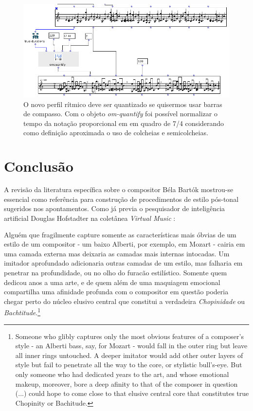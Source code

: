 \documentclass[
	12pt,				%
	openright,			%
	twoside,			%
	a4paper,			%
	english,			%
	french,				%
	spanish,			%
	brazil				%
	]{abntex2}
\begin{document}
\pagebreak
\begin{figure}[!h]
	\caption{\label{fig_grafico}O novo perfil rítmico deve ser quantizado se quisermos usar barras de compasso. Com o objeto \textit{om-quantify} foi possível normalizar o tempo da notação proporcional em em quadro de 7/4 considerando como definição aproximada o uso de colcheias e semicolcheias.  }
	\begin{center}
	    \includegraphics[scale=0.65]{OMPD/OMquantify.png}
	\end{center}
\end{figure}



\chapter*[Conclusão]{Conclusão}
\label{conclusao}

A revisão da literatura específica sobre o compositor Béla Bartók mostrou-se essencial como referência para construção de procedimentos de estilo pós-tonal sugeridos nos apontamentos. Como já previa o pesquisador de inteligência artificial Douglas Hofstadter na coletânea \textit{Virtual Music} \cite{cope2004virtual} :

\begin{citacao}
Alguém que fragilmente capture somente as características mais óbvias de um estilo de um compositor - um baixo Alberti, por exemplo, em Mozart - cairia em uma camada externa mas deixaria as camadas mais internas intocadas.
Um imitador aprofundado adicionaria outras camadas de um estilo, mas falharia em penetrar na profundidade, ou no olho do furacão estilístico. Somente quem dedicou anos a uma arte, e de quem além de uma maquiagem emocional compartilha uma afinidade profunda com o compositor em questão poderia chegar perto do núcleo elusivo central que constitui a verdadeira \textit{Chopinidade} ou \textit{Bachtitude}.\cite[p. 54]{cope2004virtual}\footnote{Someone who glibly captures only the most obvious features of a composer's style - an Alberti bass, say, for Mozart - would fall in the outer ring but leave all
inner rings untouched. A deeper imitator would add other outer layers of style but fail to penetrate all the way to the core, or stylistic bull's-eye. But only someone who had dedicated years to the art, and whose emotional makeup, moreover, bore a deep afinity to that of the composer in question (...) could hope to come close to that elusive central core that constitutes true Chopinity or Bachitude.\cite[p. 54]{cope2004virtual}}
\end{citacao}
\end{document}
